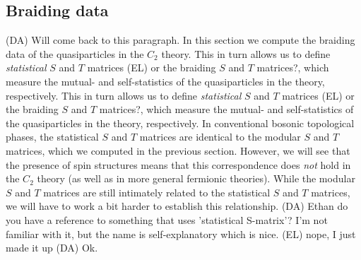 \documentclass[12pt,a4paper]{article}
\newcommand\be            {\begin{equation}}
\newcommand\ee            {\end{equation}}
\newcommand{\dave}[1]{{\color{ao(english)}\footnotesize{(DA) #1}}}
\newcommand{\ethan}[1]{{\color{amethyst}\footnotesize{(EL) #1}}}
\begin{document}

\subsection{Braiding data} \label{C2_braiding}
\dave{Will come back to this paragraph.}
In this section we compute the braiding data of the quasiparticles in the $C_2$ theory.
This in turn allows us to define {\it statistical} $S$ and $T$ matrices \ethan{or the braiding $S$ and $T$ matrices?}, 
which measure the mutual- and self-statistics of the quasiparticles in the theory, respectively. 
This in turn allows us to define {\it statistical} $S$ and $T$ matrices \ethan{or the braiding $S$ and $T$ matrices?}, 
which measure the mutual- and self-statistics of the quasiparticles in the theory, respectively. 
In conventional bosonic topological phases, the statistical $S$ and $T$ matrices are identical to the 
modular $S$ and $T$ matrices, which we computed in the previous section.
However, we will see that the presence of spin structures means that this correspondence does {\it not} 
hold in the $C_2$ theory (as well as in more general fermionic theories). 
While the modular $S$ and $T$ matrices are still intimately related to the statistical $S$ and $T$ matrices, 
we will have to work a bit harder to establish this relationship. 
\dave{Ethan do you have a reference to something that uses 'statistical S-matrix'?
I'm not familiar with it, but the name is self-explanatory which is nice.}
\ethan{nope, I just made it up}
\dave{Ok.}
\end{document}
